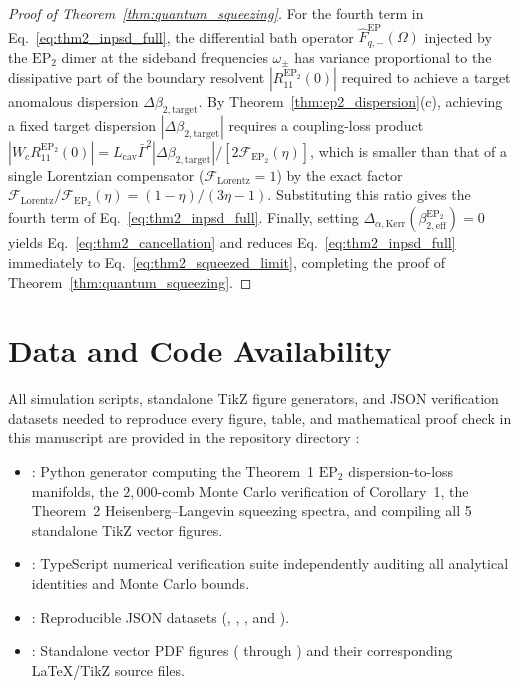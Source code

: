 \documentclass[11pt,letterpaper]{article}
\theoremstyle{definition}
\theoremstyle{remark}
\begin{document}
\begin{proof}[Proof of Theorem~\ref{thm:quantum_squeezing}]
For the fourth term in Eq.~\eqref{eq:thm2_inpsd_full}, the differential bath operator $\hat{F}_{q,-}^{\mathrm{EP}}(\Omega)$ injected by the $\mathrm{EP}_2$ dimer at the sideband frequencies $\omega_\pm$ has variance proportional to the dissipative part of the boundary resolvent $|R_{11}^{\mathrm{EP}_2}(0)|$ required to achieve a target anomalous dispersion $\Delta\beta_{2,\mathrm{target}}$. By Theorem~\ref{thm:ep2_dispersion}(c), achieving a fixed target dispersion $|\Delta\beta_{2,\mathrm{target}}|$ requires a coupling-loss product $|W_c R_{11}^{\mathrm{EP}_2}(0)| = L_{\mathrm{cav}}\bar{\Gamma}^2 |\Delta\beta_{2,\mathrm{target}}| / [2\mathcal{F}_{\mathrm{EP}_2}(\eta)]$, which is smaller than that of a single Lorentzian compensator ($\mathcal{F}_{\mathrm{Lorentz}} = 1$) by the exact factor $\mathcal{F}_{\mathrm{Lorentz}}/\mathcal{F}_{\mathrm{EP}_2}(\eta) = (1 - \eta)/(3\eta - 1)$. Substituting this ratio gives the fourth term of Eq.~\eqref{eq:thm2_inpsd_full}. Finally, setting $\Delta_{\alpha,\mathrm{Kerr}}(\beta_{2,\mathrm{eff}}^{\mathrm{EP}_2}) = 0$ yields Eq.~\eqref{eq:thm2_cancellation} and reduces Eq.~\eqref{eq:thm2_inpsd_full} immediately to Eq.~\eqref{eq:thm2_squeezed_limit}, completing the proof of Theorem~\ref{thm:quantum_squeezing}.
\end{proof}

\section*{Data and Code Availability}

{\sloppy
All simulation scripts, standalone TikZ figure generators, and JSON verification datasets needed to reproduce every figure, table, and mathematical proof check in this manuscript are provided in the repository directory :
\begin{itemize}
    \item {}: Python generator computing the Theorem~1 $\mathrm{EP}_2$ dispersion-to-loss manifolds, the $2{,}000$-comb Monte Carlo verification of Corollary~1, the Theorem~2 Heisenberg--Langevin squeezing spectra, and compiling all 5 standalone TikZ vector figures.
    \item {}: TypeScript numerical verification suite independently auditing all analytical identities and Monte Carlo bounds.
    \item {}: Reproducible JSON datasets (, , , and ).
    \item {}: Standalone vector PDF figures ( through ) and their corresponding LaTeX/TikZ source files.
\end{itemize}
\par}
\end{document}
